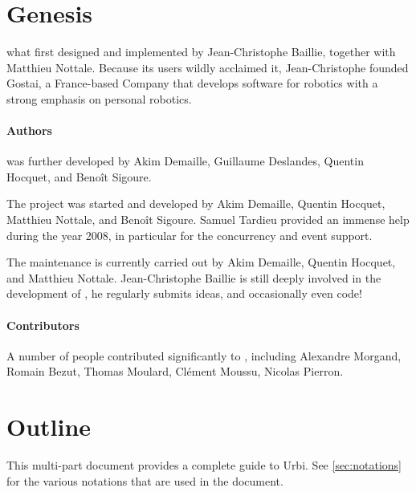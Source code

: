 \section{Genesis}
\label{sec:genesis}
\urbi what first designed and implemented by Jean-Christophe Baillie,
together with Matthieu Nottale.  Because its users wildly acclaimed it,
Jean-Christophe founded Gostai, a France-based Company that develops
software for robotics with a strong emphasis on personal robotics.

\paragraph{Authors}
 was further developed by Akim Demaille, Guillaume Deslandes, Quentin
Hocquet, and Benoît Sigoure.

The  project was started and developed by Akim Demaille, Quentin
Hocquet, Matthieu Nottale, and Benoît Sigoure.  Samuel Tardieu provided an
immense help during the year 2008, in particular for the concurrency and
event support.

The maintenance is currently carried out by Akim Demaille, Quentin
Hocquet, and Matthieu Nottale.  Jean-Christophe Baillie is still
deeply involved in the development of \us, he regularly submits ideas,
and occasionally even code!

\paragraph{Contributors}

A number of people contributed significantly to \urbi, including Alexandre
Morgand, Romain Bezut, Thomas Moulard, Clément Moussu, Nicolas Pierron.

\section{Outline}

This multi-part document provides a complete guide to Urbi.  See
\autoref{sec:notations} for the various notations that are used in the
document.

\newenvironment{partDescription}[2]
{%
  \item[\autoref{#1} --- \nameref{#1}]~\\%
  #2
  \begin{description}%
    \let\itemOrig\item%
    \renewcommand{\item}[1][]{\itemOrig[~~\autoref{##1} --- \nameref{##1}]~\\}%
  }{%
  \end{description}%
}


